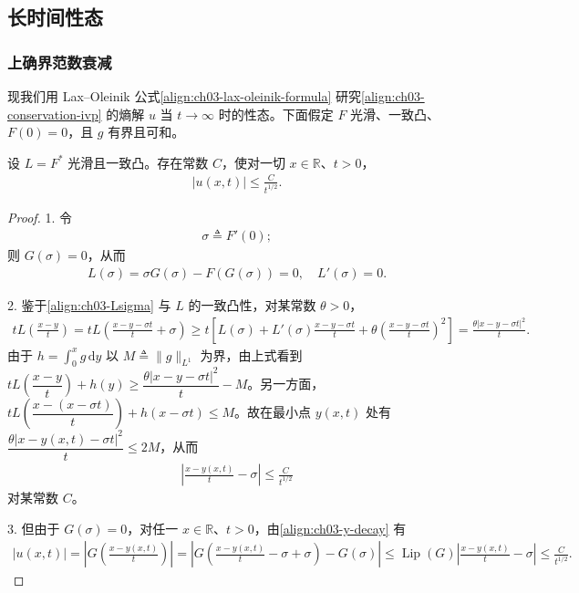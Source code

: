 \documentclass[../../main.tex]{subfiles}
\begin{document}
\subsection{长时间性态}\label{subsection:ch03-longtime}

\subsubsection{上确界范数衰减}

现我们用 Lax--Oleinik 公式\eqref{align:ch03-lax-oleinik-formula} 研究\eqref{align:ch03-conservation-ivp} 的熵解 $u$ 当 $t\to\infty$ 时的性态。下面假定 $F$ 光滑、一致凸、$F(0)=0$，且 $g$ 有界且可和。

\begin{theorem}\label{theorem:ch03-Linf-decay}设 $L=F^*$ 光滑且一致凸。存在常数 $C$，使对一切 $x\in\mathbb{R}$、$t>0$，
\begin{align}\label{align:ch03-Linf-decay}
|u(x,t)|\leqslant\frac{C}{t^{1/2}}.
\end{align}
\end{theorem}

\begin{proof}
1. 令
\begin{align}\label{align:ch03-sigma0}
\sigma\triangleq F'(0);
\end{align}
则 $G(\sigma)=0$，从而
\begin{align}\label{align:ch03-Lsigma}
L(\sigma)=\sigma G(\sigma)-F(G(\sigma))=0,\quad L'(\sigma)=0.
\end{align}

2. 鉴于\eqref{align:ch03-Lsigma} 与 $L$ 的一致凸性，对某常数 $\theta>0$，
\begin{align*}
tL\!\left(\frac{x-y}{t}\right)=tL\!\left(\frac{x-y-\sigma t}{t}+\sigma\right)
\geqslant t\left[L(\sigma)+L'(\sigma)\frac{x-y-\sigma t}{t}+\theta\left(\frac{x-y-\sigma t}{t}\right)^2\right]
=\frac{\theta|x-y-\sigma t|^2}{t}.
\end{align*}
由于 $h=\int_0^x g\,\mathrm{d}y$ 以 $M\triangleq\|g\|_{L^1}$ 为界，由上式看到 $tL\!\left(\dfrac{x-y}{t}\right)+h(y)\geqslant\dfrac{\theta|x-y-\sigma t|^2}{t}-M$。另一方面，$tL\!\left(\dfrac{x-(x-\sigma t)}{t}\right)+h(x-\sigma t)\leqslant M$。故在最小点 $y(x,t)$ 处有 $\dfrac{\theta|x-y(x,t)-\sigma t|^2}{t}\leqslant 2M$，从而
\begin{align}\label{align:ch03-y-decay}
\left|\frac{x-y(x,t)}{t}-\sigma\right|\leqslant\frac{C}{t^{1/2}}
\end{align}
对某常数 $C$。

3. 但由于 $G(\sigma)=0$，对任一 $x\in\mathbb{R}$、$t>0$，由\eqref{align:ch03-y-decay} 有
\begin{align*}
|u(x,t)|=\left|G\!\left(\frac{x-y(x,t)}{t}\right)\right|
=\left|G\!\left(\frac{x-y(x,t)}{t}-\sigma+\sigma\right)-G(\sigma)\right|
\leqslant\operatorname{Lip}(G)\left|\frac{x-y(x,t)}{t}-\sigma\right|\leqslant\frac{C}{t^{1/2}}.
\end{align*}
\end{proof}
\end{document}
